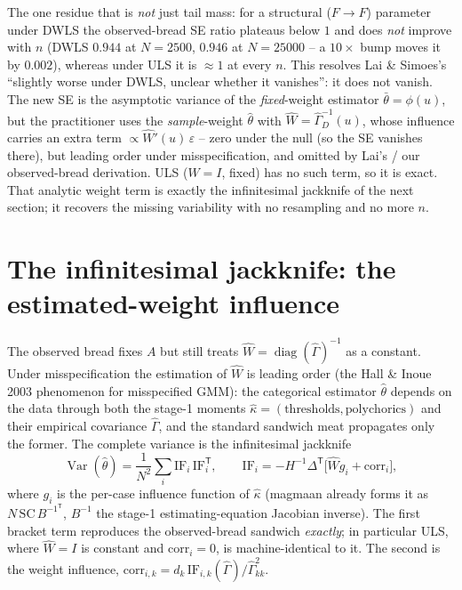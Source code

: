 \documentclass[11pt]{article}
\newcommand{\T}{^{\mathsf T}}
\begin{document}
The one residue that is \emph{not} just tail mass: for a structural
($F\!\to\!F$) parameter under DWLS the observed-bread SE ratio plateaus below
$1$ and does \emph{not} improve with $n$ (DWLS $0.944$ at $N=2500$, $0.946$ at
$N=25000$ -- a $10\times$ bump moves it by $0.002$), whereas under ULS it is
$\approx 1$ at every $n$. This resolves Lai \& Simoes's ``slightly worse under
DWLS, unclear whether it vanishes'': it does not vanish. The new SE is the
asymptotic variance of the \emph{fixed}-weight estimator $\bar\theta=\phi(u)$,
but the practitioner uses the \emph{sample}-weight $\hat\theta$ with
$\hat W=\hat\Gamma_D^{-1}(u)$, whose influence carries an extra term
$\propto \hat W'(u)\,\varepsilon$ -- zero under the null (so the SE vanishes
there), but leading order under misspecification, and omitted by Lai's / our
observed-bread derivation. ULS ($W=I$, fixed) has no such term, so it is exact.
That analytic weight term is exactly the infinitesimal jackknife of the next
section; it recovers the missing variability with no resampling and no more $n$.

\section*{The infinitesimal jackknife: the estimated-weight influence}

The observed bread fixes $A$ but still treats $\hat W=\operatorname{diag}(\hat\Gamma)^{-1}$
as a constant. Under misspecification the estimation of $\hat W$ is leading order
(the Hall \& Inoue 2003 phenomenon for misspecified GMM): the categorical
estimator $\hat\theta$ depends on the data through both the stage-1 moments
$\hat\kappa=(\text{thresholds},\text{polychorics})$ and their empirical
covariance $\hat\Gamma$, and the standard sandwich meat propagates only the
former. The complete variance is the infinitesimal jackknife
\[
  \operatorname{Var}(\hat\theta)=\frac1{N^2}\sum_i \mathrm{IF}_i\,\mathrm{IF}_i\T,
  \qquad
  \mathrm{IF}_i = -H^{-1}\Delta\T\big[\hat W g_i + \mathrm{corr}_i\big],
\]
where $g_i$ is the per-case influence function of $\hat\kappa$ (magmaan already
forms it as $N\,\mathrm{SC}\,B^{-1\T}$, $B^{-1}$ the stage-1 estimating-equation
Jacobian inverse). The first bracket term reproduces the observed-bread sandwich
\emph{exactly}; in particular ULS, where $\hat W=I$ is constant and
$\mathrm{corr}_i=0$, is machine-identical to it. The second is the weight
influence, $\mathrm{corr}_{i,k} = d_k\,\mathrm{IF}_{i,k}(\hat\Gamma)/\hat\Gamma_{kk}^2$.
\end{document}

